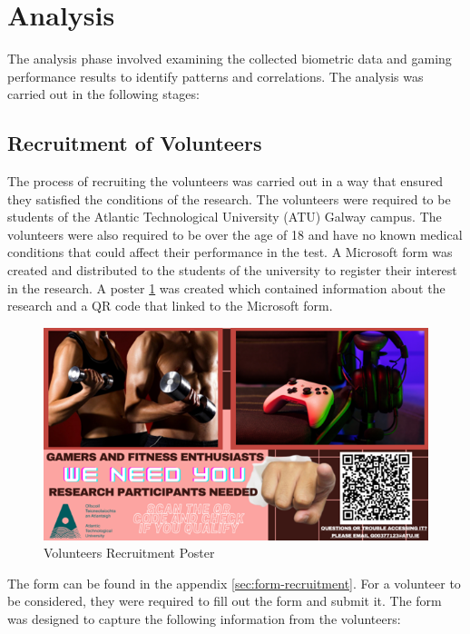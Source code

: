 \section{Analysis}
The analysis phase involved examining the collected biometric data and gaming performance results to identify patterns and correlations. The analysis was carried 
out in the following stages:

\subsection{Recruitment of Volunteers}
The process of recruiting the volunteers was carried out in a way that ensured they satisfied the conditions of the research. The volunteers were required to be students of the Atlantic 
Technological University (ATU) Galway campus. The volunteers were also required to be over the age of 18 and have no known medical conditions that could affect their performance in the
test. A Microsoft form was created and distributed to the students of the university to register their interest in the research. A poster \ref{fig:recruitment-poster} was created
which contained information about the research and a QR code that linked to the Microsoft form.

\begin{figure}[ht]
    \centering
    \includegraphics[width=0.95\linewidth]{images/poster.png}
    \caption{Volunteers Recruitment Poster}
    \label{fig:recruitment-poster}
\end{figure}

The form can be found in the appendix \ref{sec:form-recruitment}.
For a volunteer to be considered, they were required to fill out the form and submit it. The form was designed to capture the following information from the volunteers:

